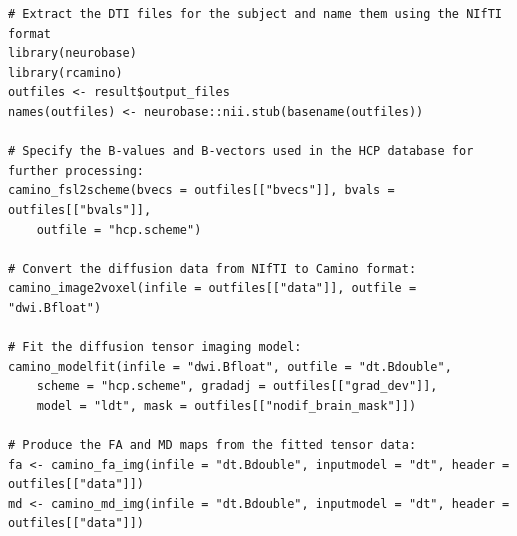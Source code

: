 \documentclass[]{elsarticle} %
\begin{document}
\color{blue}
\begin{verbatim}
# Extract the DTI files for the subject and name them using the NIfTI format
library(neurobase)
library(rcamino)
outfiles <- result$output_files
names(outfiles) <- neurobase::nii.stub(basename(outfiles))

# Specify the B-values and B-vectors used in the HCP database for further processing:
camino_fsl2scheme(bvecs = outfiles[["bvecs"]], bvals = outfiles[["bvals"]],
    outfile = "hcp.scheme")

# Convert the diffusion data from NIfTI to Camino format:
camino_image2voxel(infile = outfiles[["data"]], outfile = "dwi.Bfloat")

# Fit the diffusion tensor imaging model:
camino_modelfit(infile = "dwi.Bfloat", outfile = "dt.Bdouble", 
    scheme = "hcp.scheme", gradadj = outfiles[["grad_dev"]],
    model = "ldt", mask = outfiles[["nodif_brain_mask"]])

# Produce the FA and MD maps from the fitted tensor data:
fa <- camino_fa_img(infile = "dt.Bdouble", inputmodel = "dt", header = outfiles[["data"]])
md <- camino_md_img(infile = "dt.Bdouble", inputmodel = "dt", header = outfiles[["data"]])
\end{verbatim}
\color{black}
\end{document}
